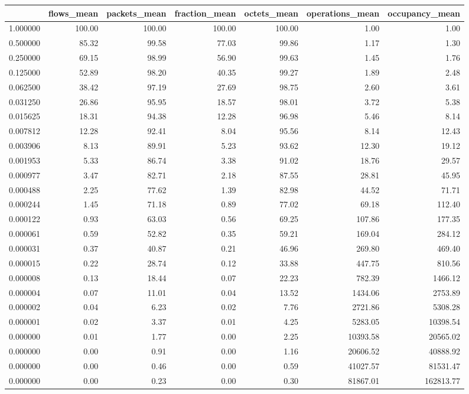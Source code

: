 \begin{tabular}{lrrrrrr}
\toprule
 & flows_mean & packets_mean & fraction_mean & octets_mean & operations_mean & occupancy_mean \\
\midrule
1.000000 & 100.00 & 100.00 & 100.00 & 100.00 & 1.00 & 1.00 \\
0.500000 & 85.32 & 99.58 & 77.03 & 99.86 & 1.17 & 1.30 \\
0.250000 & 69.15 & 98.99 & 56.90 & 99.63 & 1.45 & 1.76 \\
0.125000 & 52.89 & 98.20 & 40.35 & 99.27 & 1.89 & 2.48 \\
0.062500 & 38.42 & 97.19 & 27.69 & 98.75 & 2.60 & 3.61 \\
0.031250 & 26.86 & 95.95 & 18.57 & 98.01 & 3.72 & 5.38 \\
0.015625 & 18.31 & 94.38 & 12.28 & 96.98 & 5.46 & 8.14 \\
0.007812 & 12.28 & 92.41 & 8.04 & 95.56 & 8.14 & 12.43 \\
0.003906 & 8.13 & 89.91 & 5.23 & 93.62 & 12.30 & 19.12 \\
0.001953 & 5.33 & 86.74 & 3.38 & 91.02 & 18.76 & 29.57 \\
0.000977 & 3.47 & 82.71 & 2.18 & 87.55 & 28.81 & 45.95 \\
0.000488 & 2.25 & 77.62 & 1.39 & 82.98 & 44.52 & 71.71 \\
0.000244 & 1.45 & 71.18 & 0.89 & 77.02 & 69.18 & 112.40 \\
0.000122 & 0.93 & 63.03 & 0.56 & 69.25 & 107.86 & 177.35 \\
0.000061 & 0.59 & 52.82 & 0.35 & 59.21 & 169.04 & 284.12 \\
0.000031 & 0.37 & 40.87 & 0.21 & 46.96 & 269.80 & 469.40 \\
0.000015 & 0.22 & 28.74 & 0.12 & 33.88 & 447.75 & 810.56 \\
0.000008 & 0.13 & 18.44 & 0.07 & 22.23 & 782.39 & 1466.12 \\
0.000004 & 0.07 & 11.01 & 0.04 & 13.52 & 1434.06 & 2753.89 \\
0.000002 & 0.04 & 6.23 & 0.02 & 7.76 & 2721.86 & 5308.28 \\
0.000001 & 0.02 & 3.37 & 0.01 & 4.25 & 5283.05 & 10398.54 \\
0.000000 & 0.01 & 1.77 & 0.00 & 2.25 & 10393.58 & 20565.02 \\
0.000000 & 0.00 & 0.91 & 0.00 & 1.16 & 20606.52 & 40888.92 \\
0.000000 & 0.00 & 0.46 & 0.00 & 0.59 & 41027.57 & 81531.47 \\
0.000000 & 0.00 & 0.23 & 0.00 & 0.30 & 81867.01 & 162813.77 \\
\bottomrule
\end{tabular}
